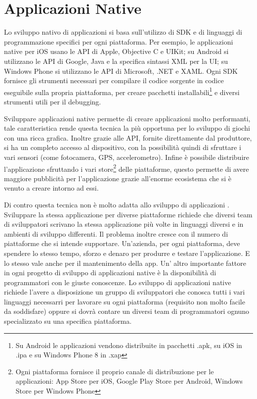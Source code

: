 	\section{Applicazioni Native}
	\label{sec:nativapp}
		Lo sviluppo nativo di applicazioni si basa sull'utilizzo di SDK e di 
		linguaggi di programmazione specifici per ogni piattaforma. Per esempio, 
		le applicazioni native per iOS usano le API di Apple, Objective C e 
		UIKit; su Android si utilizzano le API di Google, Java e la specifica 
		sintassi XML per la UI; su Windows Phone si utilizzano le API di 
		Microsoft, .NET e XAML. Ogni SDK fornisce gli strumenti necessari per 
		compilare il codice sorgente in codice eseguibile sulla propria 
		piattaforma, per creare pacchetti installabili\footnote{Su Android le 
		applicazioni vendono distribuite in pacchetti .apk, su iOS in .ipa e su 
		Windows Phone 8 in .xap} e diversi strumenti utili per il debugging.

		Sviluppare applicazioni native permette di creare applicazioni molto 
		performanti, tale caratteristica rende questa tecnica la più opportuna 
		per lo sviluppo di giochi con una ricca grafica. Inoltre grazie alle 
		API, fornite direttamente dal produttore, si ha un completo accesso al 
		dispositivo, con la possibilità quindi di sfruttare i vari sensori 
		(come fotocamera, GPS, accelerometro). Infine è possibile distribuire 
		l'applicazione sfruttando i vari store\footnote{Ogni piattaforma 
		fornisce il proprio canale di distribuzione per le applicazioni: 
		App Store per iOS, Google Play Store per Android, Windows Store per 
		Windows Phone} delle piattaforme, questo permette di avere maggiore 
		pubblicità per l'applicazione grazie all'enorme ecosistema che si è 
		venuto a creare intorno ad essi.

		Di contro questa tecnica non è molto adatta allo sviluppo di 
		applicazioni \crossplat. Sviluppare la stessa applicazione per 
		diverse piattaforme richiede che diversi team di sviluppatori scrivano 
		la stessa applicazione più volte in linguaggi diversi e in ambienti di 
		sviluppo differenti. Il problema inoltre cresce con il numero di 
		piattaforme che si intende supportare. Un'azienda, per ogni piattaforma, 
		deve spendere lo stesso tempo, sforzo e denaro per produrre e testare 
		l'applicazione. E lo stesso vale anche per il mantenimento della app. 
		Un' altro importante fattore in ogni progetto di sviluppo di 
		applicazioni native \crossplat è la disponibilità di programmatori 
		con le giuste conoscenze. Lo sviluppo di applicazioni native richiede 
		l'avere a disposizione un gruppo di sviluppatori che conosca tutti i 
		vari linguaggi necessarri per lavorare su ogni piattaforma (requisito 
		non	molto facile da soddisfare) oppure si dovrà contare un diversi team 
		di programmatori ognuno specializzato su una specifica piattaforma.
		
